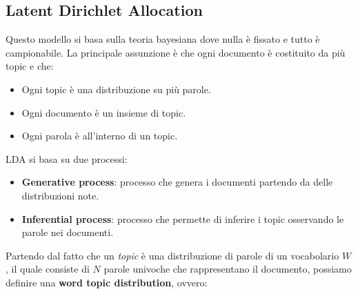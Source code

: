 \subsection{Latent Dirichlet Allocation}
Questo modello si basa sulla teoria bayesiana dove nulla è fissato e tutto è
campionabile. La principale assunzione è che ogni documento è costituito da più
topic e che:
\begin{itemize}
      \item Ogni topic è una distribuzione su più parole.
      \item Ogni documento è un insieme di topic.
      \item Ogni parola è all'interno di un topic.
\end{itemize}
LDA si basa su due processi:
\begin{itemize}
      \item \textbf{Generative process}: processo che genera i documenti partendo
            da delle distribuzioni note.
      \item \textbf{Inferential process}: processo che permette di inferire i topic
            osservando le parole nei documenti.
\end{itemize}
Partendo dal fatto che un \textit{topic} è una distribuzione di parole di un
vocabolario $W$, il quale consiste di $N$ parole univoche che rappresentano il
documento, possiamo definire una \textbf{word topic distribution}, ovvero:
